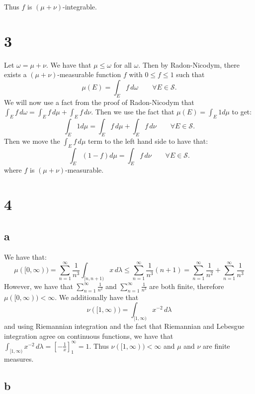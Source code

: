 \documentclass{article}
\theoremstyle{definition}
\numberwithin{theorem}{section}
\numberwithin{equation}{section}
\begin{document}
Thus $f$ is $(\mu + \nu)$-integrable. 

\section{3}
Let $\omega = \mu + \nu$. We have that $\mu \leq \omega$ for all $\omega$. Then by Radon-Nicodym, there exists a $(\mu + \nu)$-measurable function $f$ with $0 \leq f \leq 1$ such that
\begin{equation}
	\mu(E) = \int_E f \, d\omega \qquad \forall E \in \mathcal{S}.
\end{equation} 
We will now use a fact from the proof of Radon-Nicodym that $\int_E f \, d\omega = \int_E f \, d\mu +  \int_E f \, d\nu$. Then we use the fact that $\mu(E) = \int_E 1 d\mu$ to get:
\begin{equation}
	\int_E 1 d\mu = \int_E f \, d\mu +  \int_E f \, d\nu \qquad \forall E \in \mathcal{S}.
\end{equation}
Then we move the $\int_E f \, d\mu$ term to the left hand side to have that:
\begin{equation}
	\int_E \left(1 - f\right) d\mu = \int_E f \, d\nu \qquad \forall E \in \mathcal{S}.
\end{equation}
where $f$ is $(\mu + \nu)$-measurable. 
\section{4}

\subsection{a}
We have that:
\begin{equation}
	\mu([0, \infty)) = \sum_{n = 1}^{\infty} \frac{1}{n^3} \int_{[n, n + 1)} x \, d\lambda \leq \sum_{n = 1}^{\infty} \frac{1}{n^3} (n + 1) = \sum_{n = 1}^{\infty} \frac{1}{n^2} + \sum_{n = 1}^{\infty} \frac{1}{n^3}
\end{equation}
However, we have that $\sum_{n = 1}^{\infty} \frac{1}{n^2}$ and $\sum_{n = 1}^{\infty} \frac{1}{n^3}$ are both finite, therefore $\mu([0, \infty)) < \infty$. 
We additionally have that
\begin{equation}
	\nu([1, \infty)) = \int_{[1, \infty)} x^{-2} \, d\lambda
\end{equation}
and using Riemannian integration and the fact that Riemannian and Lebesgue integration agree on continuous functions, we have that $\int_{[1, \infty)} x^{-2} \, d\lambda = \left[ -\frac{1}{x} \right]^\infty_{1} = 1$. Thus $\nu([1, \infty)) < \infty$ and $\mu$ and $\nu$ are finite measures. 
\subsection{b}
\end{document}
